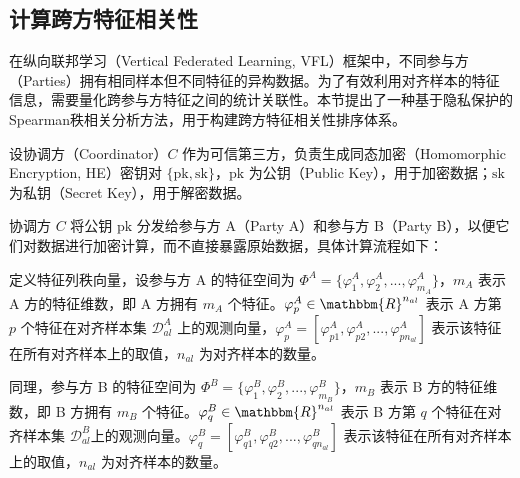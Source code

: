 \subsection{计算跨方特征相关性}
在纵向联邦学习（Vertical Federated Learning, VFL）框架中，不同参与方（Parties）拥有相同样本但不同特征的异构数据。为了有效利用对齐样本的特征信息，需要量化跨参与方特征之间的统计关联性。本节提出了一种基于隐私保护的Spearman秩相关分析方法，用于构建跨方特征相关性排序体系。

设协调方（Coordinator）$ C $ 作为可信第三方，负责生成同态加密（Homomorphic Encryption, HE）密钥对 $ \{\text{pk}, \text{sk}\} $，$ \text{pk} $ 为公钥（Public Key），用于加密数据；$ \text{sk} $ 为私钥（Secret Key），用于解密数据。

协调方 $ C $ 将公钥 $ \text{pk} $ 分发给参与方 A（Party A）和参与方 B（Party B），以便它们对数据进行加密计算，而不直接暴露原始数据，具体计算流程如下：

定义特征列秩向量，设参与方 A 的特征空间为 $ \Phi^A = \{\varphi^A_1, \varphi^A_2, ..., \varphi^A_{m_A}\} $，$ m_A $ 表示 A 方的特征维数，即 A 方拥有 $ m_A $ 个特征。$ \varphi^A_p \in \mathbbm{R}^{n_{al}} $ 表示 A 方第 $ p $ 个特征在对齐样本集 $ \mathcal{D}^A_{al} $ 上的观测向量，$ \varphi^A_p = [\varphi^A_{p1}, \varphi^A_{p2}, ..., \varphi^A_{pn_{al}}] $ 表示该特征在所有对齐样本上的取值，$ n_{al} $ 为对齐样本的数量。

同理，参与方 B 的特征空间为 $ \Phi^B = \{\varphi^B_1, \varphi^B_2, ..., \varphi^B_{m_B}\} $，$ m_B $ 表示 B 方的特征维数，即 B 方拥有 $ m_B $ 个特征。$ \varphi^B_q \in \mathbbm{R}^{n_{al}} $ 表示 B 方第 $ q $ 个特征在对齐样本集 $ \mathcal{D}^B_{al} $上的观测向量。$ \varphi^B_q = [\varphi^B_{q1}, \varphi^B_{q2}, ..., \varphi^B_{qn_{al}}] $ 表示该特征在所有对齐样本上的取值，$ n_{al} $ 为对齐样本的数量。

